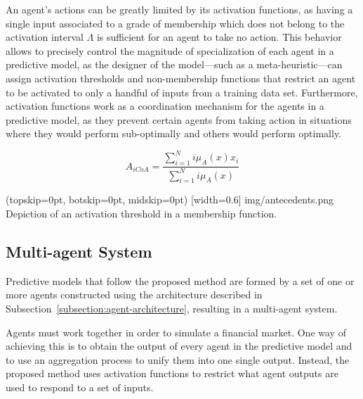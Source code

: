 \documentclass{ieeeaccess}
\begin{document}
An agent's actions can be greatly limited by its activation functions, as having
a single input associated to a grade of membership which does not belong to the
activation interval $\Lambda$ is sufficient for an agent to take no action. This
behavior allows to precisely control the magnitude of specialization of each agent
in a predictive model, as the designer of the model---such as a
meta-heuristic---can assign activation thresholds and non-membership functions
that restrict an agent to be activated to only a handful of inputs from a
training data set. Furthermore, activation functions work as a coordination
mechanism for the agents in a predictive model, as they prevent certain agents
from taking action in situations where they would perform sub-optimally and
others would perform optimally.

\begin{equation}
  \label{equation:activation-interval}
  A_{iCoA} = \dfrac{\sum_{i=1}^{N} i\mu_{A}(x) x_{i}}{\sum_{i=1}^{N}
    i\mu_{A}(x)}
\end{equation}

\Figure[](topskip=0pt, botskip=0pt, midskip=0pt)
[width=0.6\linewidth]
{img/antecedents.png}
{Depiction of an activation threshold in a membership function.
  \label{figure:activation-threshold}}

\subsection{Multi-agent System}
\label{subsection:mult-agent-system}

Predictive models that follow the proposed method are formed by a set
of one or more agents constructed using the architecture described in
Subsection~\ref{subsection:agent-architecture}, resulting in a multi-agent
system.

Agents must work together in order to simulate a financial market. One
way of achieving this is to obtain the output of every agent in the
predictive model and to use an aggregation process to unify them into
one single output. Instead, the proposed method uses activation
functions to restrict what agent outputs are used to respond to a set
of inputs.
\end{document}
